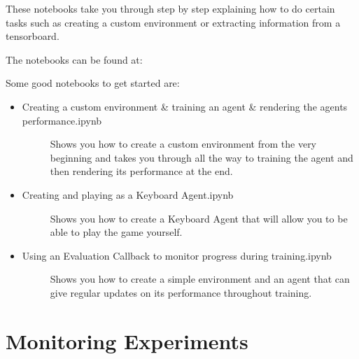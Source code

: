 \documentclass[letterpaper,10pt,english]{sphinxmanual}
\begin{document}
\sphinxAtStartPar
These notebooks take you through step by step explaining how to do certain tasks such as
creating a custom environment or extracting information from a tensorboard.
\begin{description}
\item[{The notebooks can be found at:}] \leavevmode
\sphinxAtStartPar
{}

\end{description}

\sphinxAtStartPar
Some good notebooks to get started are:
\begin{itemize}
\item {} \begin{description}
\item[{Creating a custom environment \& training an agent \& rendering the agents performance.ipynb}] \leavevmode
\sphinxAtStartPar
Shows you how to create a custom environment from the very beginning and takes you through all the way
to training the agent and then rendering its performance at the end.

\end{description}

\item {} \begin{description}
\item[{Creating and playing as a Keyboard Agent.ipynb}] \leavevmode
\sphinxAtStartPar
Shows you how to create a Keyboard Agent that will allow you to be able to play the game yourself.

\end{description}

\item {} \begin{description}
\item[{Using an Evaluation Callback to monitor progress during training.ipynb}] \leavevmode
\sphinxAtStartPar
Shows you how to create a simple environment and an agent that can give regular updates on its
performance throughout training.

\end{description}

\end{itemize}


\chapter{Monitoring Experiments}
\label{\detokenize{source/experiments:monitoring-experiments}}\label{\detokenize{source/experiments::doc}}
\end{document}
